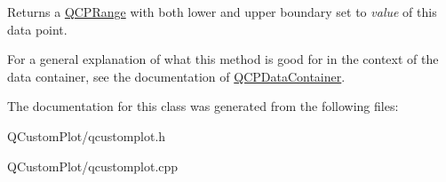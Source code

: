 Returns a \mbox{\hyperlink{class_q_c_p_range}{Q\+C\+P\+Range}} with both lower and upper boundary set to {\itshape value} of this data point.

For a general explanation of what this method is good for in the context of the data container, see the documentation of \mbox{\hyperlink{class_q_c_p_data_container}{Q\+C\+P\+Data\+Container}}. 

The documentation for this class was generated from the following files\+:\begin{DoxyCompactItemize}
\item 
Q\+Custom\+Plot/qcustomplot.\+h\item 
Q\+Custom\+Plot/qcustomplot.\+cpp\end{DoxyCompactItemize}
